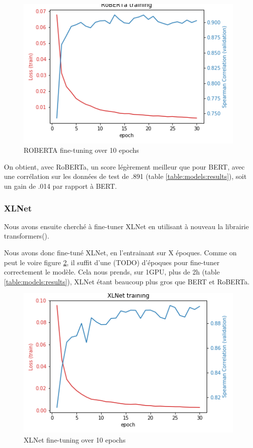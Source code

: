 \documentclass[11pt,a4paper, french]{article}
\begin{document}
\begin{figure}
  \includegraphics[width=\linewidth]{resources/roberta-training.png}
  \caption{ROBERTA fine-tuning over 10 epochs}
  \label{fig:roberta:finetunning}
\end{figure}

On obtient, avec RoBERTa, un score légèrement meilleur que pour BERT, avec une corrélation sur les données de test de .891 (table \ref{table:models:results}), soit un gain de .014 par rapport à BERT.

%
\subsubsection{XLNet}

Nous avons ensuite cherché à fine-tuner XLNet en utilisant à nouveau la librairie transformers(\cite{huggingface}).

Nous avons donc fine-tuné XLNet, en l'entrainant sur X époques. Comme on peut le voire figure \ref{fig:xlnet:finetunning}, il suffit d'une (TODO) d'époques pour fine-tuner correctement le modèle. Cela nous prends, sur 1GPU, plus de 2h (table \ref{table:models:results}), XLNet étant beaucoup plus gros que BERT et RoBERTa.

\begin{figure}
  \includegraphics[width=\linewidth]{resources/xlnet-training.png}
  \caption{XLNet fine-tuning over 10 epochs}
  \label{fig:xlnet:finetunning}
\end{figure}
\end{document}
